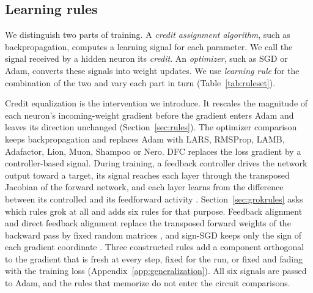 \documentclass{article} %
\begin{document}
\subsection{Learning rules}
\label{sec:ruleset}
We distinguish two parts of training. A \emph{credit assignment algorithm}, such as backpropagation, computes a learning signal for each parameter. We call the signal received by a hidden neuron its \emph{credit}. An \emph{optimizer}, such as SGD or Adam, converts these signals into weight updates. We use \emph{learning rule} for the combination of the two and vary each part in turn (Table~\ref{tab:ruleset}).

Credit equalization is the intervention we introduce. It rescales the magnitude of each neuron's incoming-weight gradient before the gradient enters Adam and leaves its direction unchanged (Section~\ref{sec:rules}). The optimizer comparison keeps backpropagation and replaces Adam with LARS, RMSProp, LAMB, Adafactor, Lion, Muon, Shampoo or Nero. DFC replaces the loss gradient by a controller-based signal. During training, a feedback controller drives the network output toward a target, its signal reaches each layer through the transposed Jacobian of the forward network, and each layer learns from the difference between its controlled and its feedforward activity \citep{meulemans2021dfc}. Section~\ref{sec:grokrules} asks which rules grok at all and adds six rules for that purpose. Feedback alignment and direct feedback alignment replace the transposed forward weights of the backward pass by fixed random matrices \citep{lillicrap2016feedback,nokland2016dfa}, and sign-SGD keeps only the sign of each gradient coordinate \citep{bernstein2018signsgd}. Three constructed rules add a component orthogonal to the gradient that is fresh at every step, fixed for the run, or fixed and fading with the training loss (Appendix~\ref{app:generalization}). All six signals are passed to Adam, and the rules that memorize do not enter the circuit comparisons.
\end{document}
